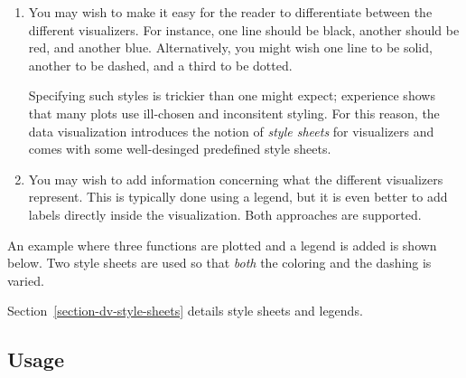 \begin{enumerate}
\item You may wish to make it easy for the reader to differentiate
  between the different visualizers. For instance, one line should be
  black, another should be red, and another blue. Alternatively, you
  might wish one line to be solid, another to be dashed, and a third
  to be dotted.

  Specifying such styles is trickier than one might expect; experience
  shows that many plots use ill-chosen and inconsitent
  styling. For this reason, the data visualization introduces the
  notion of \emph{style sheets} for visualizers and comes with some
  well-desinged predefined style sheets.
\item You may wish to add information concerning what the different
  visualizers represent. This is typically done using a legend, but it
  is even better to add labels directly inside the visualization. Both
  approaches are supported.
\end{enumerate}

An example where three functions are plotted and a legend is added is
shown below. Two style sheets are used so that \emph{both} the
coloring and the dashing is varied.

\begin{codeexample}[]
\end{codeexample}

Section~\ref{section-dv-style-sheets} details style sheets and
legends. 


\subsection{Usage}
\label{section-dv-data-syntax}

